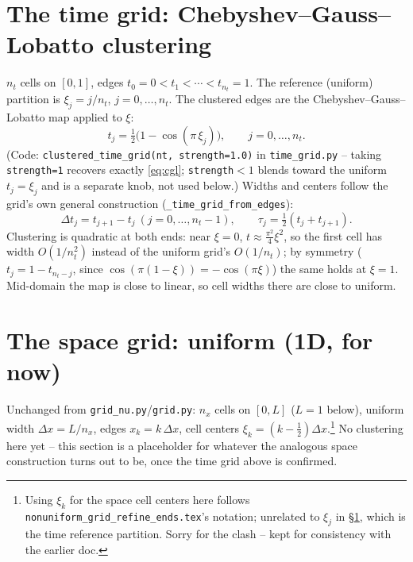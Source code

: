 \documentclass[11pt]{article}
\newcommand{\dt}{\Delta t}
\newcommand{\dx}{\Delta x}
\newcommand{\code}[1]{\texttt{#1}}
\begin{document}
\section{The time grid: Chebyshev--Gauss--Lobatto clustering}
\label{sec:time-grid}

$n_t$ cells on $[0,1]$, edges $t_0=0<t_1<\cdots<t_{n_t}=1$. The reference (uniform)
partition is $\xi_j = j/n_t$, $j=0,\ldots,n_t$. The clustered edges are the
Chebyshev--Gauss--Lobatto map applied to $\xi$:
\begin{equation}
  \label{eq:cgl}
  t_j = \tfrac12\bigl(1-\cos(\pi\,\xi_j)\bigr), \qquad j = 0,\ldots,n_t.
\end{equation}
(Code: \code{clustered\_time\_grid(nt, strength=1.0)} in \code{time\_grid.py} -- taking
\code{strength=1} recovers exactly \eqref{eq:cgl}; \code{strength}$<1$ blends toward the
uniform $t_j=\xi_j$ and is a separate knob, not used below.) Widths and centers follow the
grid's own general construction (\code{\_time\_grid\_from\_edges}):
\[
  \dt_j = t_{j+1}-t_j \ (j=0,\ldots,n_t-1), \qquad \tau_j = \tfrac12(t_j+t_{j+1}).
\]
Clustering is quadratic at both ends: near $\xi=0$, $t\approx \tfrac{\pi^2}{4}\xi^2$, so
the first cell has width $O(1/n_t^2)$ instead of the uniform grid's $O(1/n_t)$; by
symmetry ($t_j = 1 - t_{n_t-j}$, since $\cos(\pi(1-\xi))=-\cos(\pi\xi)$) the same holds at
$\xi=1$. Mid-domain the map is close to linear, so cell widths there are close to
uniform.

\section{The space grid: uniform (1D, for now)}
\label{sec:space-grid}

Unchanged from \code{grid\_nu.py}/\code{grid.py}: $n_x$ cells on $[0,L]$ ($L=1$ below),
uniform width $\dx = L/n_x$, edges $x_k = k\,\dx$, cell centers $\xi_k =
(k-\tfrac12)\dx$.\footnote{Using $\xi_k$ for the space cell centers here follows
\code{nonuniform\_grid\_refine\_ends.tex}'s notation; unrelated to $\xi_j$ in
\S\ref{sec:time-grid}, which is the time reference partition. Sorry for the clash -- kept
for consistency with the earlier doc.} No clustering here yet -- this section is a
placeholder for whatever the analogous space construction turns out to be, once the time
grid above is confirmed.
\end{document}
